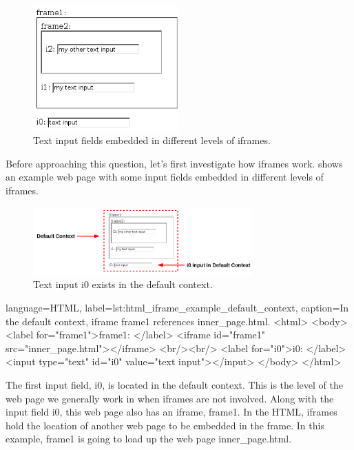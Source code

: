 \begin{figure}[tbh]
  \centering
  \includegraphics[width=0.50\textwidth]
    {../../images/iframewrap_inputs_example_base.png}
  \caption{Text input fields embedded in different levels of iframes.}
  \label{fig:iframewrap_inputs_example_base}
\end{figure}


Before approaching this question, let's first investigate how iframes work.
 shows an example web page with
some input fields embedded in different levels of iframes.

\begin{figure}[tbh]
  \centering
  \includegraphics[width=0.75\textwidth]
    {../../images/iframewrap_inputs_example_frame_0.png}
  \caption{Text input i0 exists in the default context.}
  \label{fig:iframewrap_inputs_example_frame_0}
\end{figure}

\begin{xcode}{%
  language=HTML,%
  label=lst:html_iframe_example_default_context,%
  caption={In the default context, iframe frame1 references inner\_page.html.}%
}
<html>
    <body>
        <label for="frame1">frame1: </label>
        <iframe id="frame1" src="inner_page.html"></iframe>
        <br/><br/>
        <label for="i0">i0: </label>
        <input type="text" id="i0" value="text input"></input>
    </body>
</html>
\end{xcode}


The first input field, i0, is located in the default context. This is the level
of the web page we generally work in when iframes are not involved.  Along with
the input field i0, this web page also has an iframe, frame1.  In the HTML,
iframes hold the location of another web page to be embedded in the frame. In
this example, frame1 is going to load up the web page inner\_page.html.


